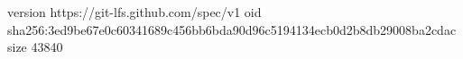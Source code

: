 version https://git-lfs.github.com/spec/v1
oid sha256:3ed9be67e0c60341689c456bb6bda90d96c5194134ecb0d2b8db29008ba2cdac
size 43840
